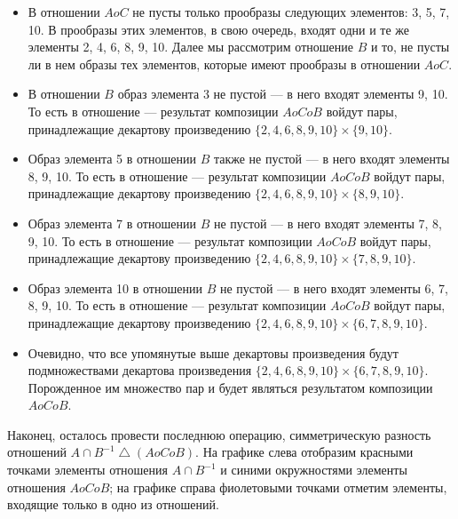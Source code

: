 \documentclass[12pt]{article}
\begin{document}
	\begin{itemize}
		\item{В отношении $A o C$ не пусты только прообразы следующих элементов: 3, 5, 7, 10. В прообразы этих элементов, в свою очередь, входят одни и те же элементы 2, 4, 6, 8, 9, 10. Далее мы рассмотрим отношение $B$ и то, не пусты ли в нем образы тех элементов, которые имеют прообразы в отношении  $A o C$.}
		\item{В отношении $B$ образ элемента 3 не пустой --- в него входят элементы 9, 10. То есть в отношение --- результат композиции $A o C o B$ войдут пары, принадлежащие декартову произведению $\{2, 4, 6, 8, 9, 10\} \times \{9, 10\}$.}
		\item{Образ элемента 5 в отношении $B$ также не пустой --- в него входят элементы 8, 9, 10. То есть в отношение --- результат композиции $A o C o B$ войдут пары, принадлежащие декартову произведению $\{2, 4, 6, 8, 9, 10\} \times \{8, 9, 10\}$.}
		\item{Образ элемента 7 в отношении $B$ не пустой --- в него входят элементы 7, 8, 9, 10. То есть в отношение --- результат композиции $A o C o B$ войдут пары, принадлежащие декартову произведению $\{2, 4, 6, 8, 9, 10\} \times \{7, 8, 9, 10\}$.}
		\item{Образ элемента 10 в отношении $B$ не пустой --- в него входят элементы 6, 7, 8, 9, 10. То есть в отношение --- результат композиции $A o C o B$ войдут пары, принадлежащие декартову произведению $\{2, 4, 6, 8, 9, 10\} \times \{6, 7, 8, 9, 10\}$.}
		\item{Очевидно, что все упомянутые выше декартовы произведения будут подмножествами декартова произведения $\{2, 4, 6, 8, 9, 10\} \times \{6, 7, 8, 9, 10\}$. Порожденное им множество пар и будет являться результатом композиции $A o C o B$.}
	\end{itemize}
	Наконец, осталось провести последнюю операцию, симметрическую разность отношений $A \cap B^{-1} \bigtriangleup (A o C o B)$. На графике слева отобразим красными точками элементы отношения $A \cap B^{-1}$ и синими окружностями элементы отношения $A o C o B$; на графике справа фиолетовыми точками отметим элементы, входящие только в одно из отношений.
	
\end{document}

